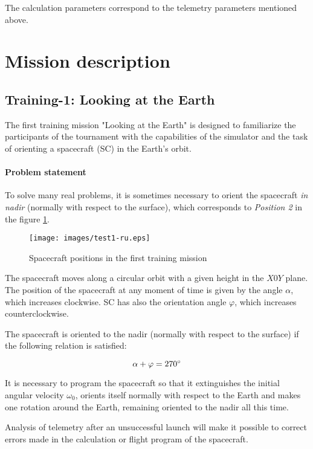 \documentclass[12pt,a4paper]{article}
\begin{document}
The calculation parameters correspond to the telemetry parameters mentioned above.

\section{Mission description}
\label{Sec:Missions}

\subsection{Training-1: Looking at the Earth}

The first training mission "Looking at the Earth" is designed to familiarize the participants of the tournament with the capabilities of the simulator and the task of orienting a spacecraft (SC) in the Earth's orbit.

\paragraph{Problem statement} To solve many real problems, it is sometimes necessary to orient the spacecraft \emph{in nadir} (normally with respect to the surface), which corresponds to \emph{Position 2} in the figure \ref{Pic:test1}.

\begin{figure}[tbh]
  \begin{center}
    \texttt{[image: images/test1-ru.eps]}
    \caption{Spacecraft positions in the first training mission}
    \label{Pic:test1}
  \end{center}
\end{figure}

The spacecraft moves along a circular orbit with a given height in the $X0Y$ plane. The position of the spacecraft at any moment of time is given by the angle $\alpha$, which increases clockwise. SC has
also the orientation angle $\varphi$, which increases counterclockwise.

The spacecraft is oriented to the nadir (normally with respect to the surface) if the following relation is satisfied:

$$
\alpha + \varphi = 270 \degree
$$

It is necessary to program the spacecraft so that it extinguishes the initial angular velocity $\omega_0$, orients itself normally with respect to the Earth and makes one rotation around the Earth, remaining oriented to the nadir all this time.

Analysis of telemetry after an unsuccessful launch will make it possible to correct errors made in the calculation or flight program of the spacecraft.
\end{document}
